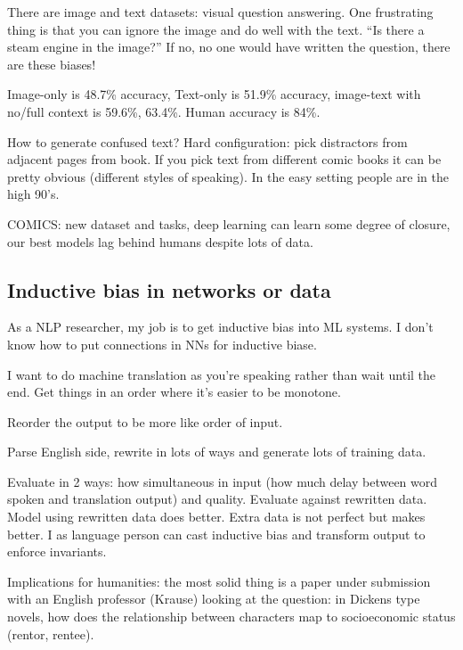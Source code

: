There are image and text datasets: visual question answering. One frustrating thing is that you can ignore the image and do well with the text. ``Is there a steam engine in the image?'' If no, no one would have written the question, there are these biases!

Image-only is 48.7\% accuracy, Text-only is 51.9\% accuracy, image-text with no/full context is 59.6\%, 63.4\%. Human accuracy is 84\%.

How to generate confused text? Hard configuration: pick distractors from adjacent pages from book. If you pick text from different comic books it can be pretty obvious (different styles of speaking).  In the easy setting people are in the high 90's.

COMICS: new dataset and tasks, deep learning can learn some degree of closure, our best models lag behind humans despite lots of data.

\subsection{Inductive bias in networks or data}

As a NLP researcher, my job is to get inductive bias into ML systems. I don't know how to put connections in NNs for inductive biase. 

I want to do machine translation as you're speaking rather than wait until the end. 
Get things in an order where it's easier to be monotone.

Reorder the output to be more like order of input.

Parse English side, rewrite in lots of ways and generate lots of training data.

Evaluate in 2 ways: how simultaneous in input (how much delay between word spoken and translation output) and quality. Evaluate against rewritten data. Model using rewritten data does better. %
Extra data is not perfect but makes better. I as language person can cast inductive bias and transform output to enforce invariants.



Implications for humanities: the most solid thing is a paper under submission with an English professor (Krause) looking at the question: in Dickens type novels, how does the relationship between characters map to socioeconomic status (rentor, rentee). 